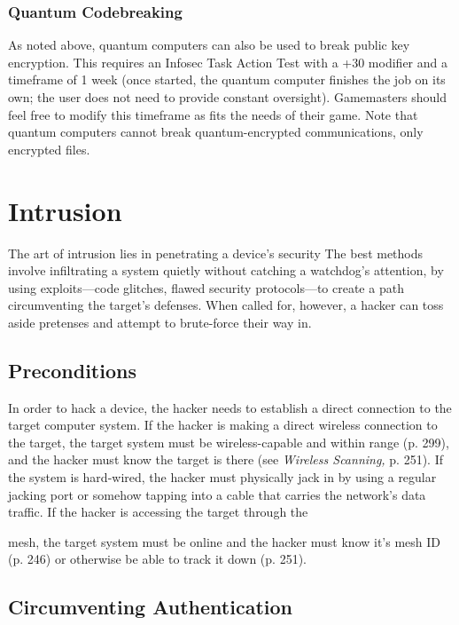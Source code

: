 \subsubsection{Quantum Codebreaking} 

As noted above, quantum computers can also be used to break public key encryption. This requires an Infosec Task Action Test with a +30 modifier and a timeframe of 1 week (once started, the quantum computer finishes the job on its own; the user does not need to provide constant oversight). Gamemasters should feel free to modify this timeframe as fits the needs of their game. Note that quantum computers cannot break quantum-encrypted communications, only encrypted files. 

\section{Intrusion} 

The art of intrusion lies in penetrating a device's security The best methods involve infiltrating a system quietly without catching a watchdog's attention, by using exploits—code glitches, flawed security protocols—to create a path circumventing the target's defenses. When called for, however, a hacker can toss aside pretenses and attempt to brute-force their way in. 

\subsection{Preconditions} 

In order to hack a device, the hacker needs to establish a direct connection to the target computer system. If the hacker is making a direct wireless connection to the target, the target system must be wireless-capable and within range (p. 299), and the hacker must know the target is there (see \textit{Wireless Scanning,} p. 251). If the system is hard-wired, the hacker must physically jack in by using a regular jacking port or somehow tapping into a cable that carries the network's data traffic. If the hacker is accessing the target through the 

mesh, the target system must be online and the hacker must know it's mesh ID (p. 246) or otherwise be able to track it down (p. 251). 

\subsection{Circumventing Authentication} 

